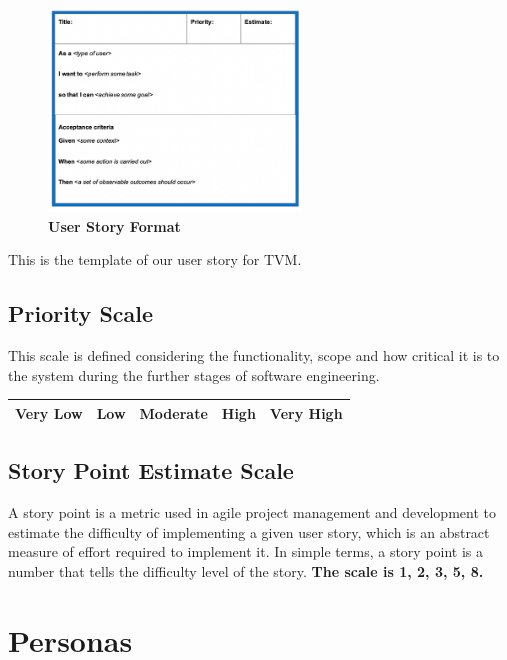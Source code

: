 \documentclass[15pt]{article}
\begin{document}
\begin{figure}[H]
\centering
\includegraphics[width=0.60\textwidth]{User_Story_Format.png}\par\vspace{0.1cm}
\caption{\Large\bfseries{User Story Format}}
\label{User Story Format:do}
\end{figure}

\Large{This is the template of our user story for TVM.
}

\subsection{\Large{Priority Scale}}
\Large{This scale is defined considering the functionality, scope and how critical it is to the system during the further stages of software engineering.\cite{popli2014prioritising} 
}

\begin{longtable}{| p{} | p{} | p{} | p{} | p{} |} 
 \hline
  {\bfseries Very Low} & {\bfseries Low} & {\bfseries Moderate} & {\bfseries High} & {\bfseries Very High} \\
 \hline
  \end{longtable}

\subsection{\Large{Story Point Estimate Scale}}
\Large{A story point is a metric used in agile project management and development to estimate the difficulty of implementing a given user story, which is an abstract measure of effort required to implement it. In simple terms, a story point is a number that tells the difficulty level of the story.\cite{coelho2012effort} {\bfseries The scale is 1, 2, 3, 5, 8.}
}

\section{Personas\cite{sim2014empowering}}
\end{document}
